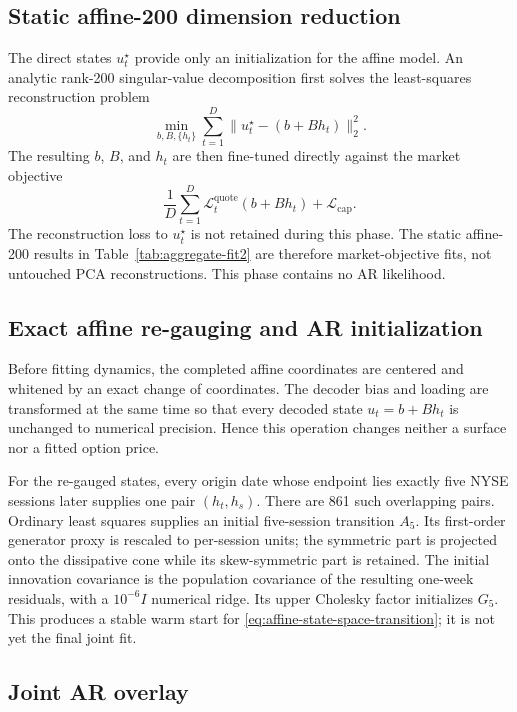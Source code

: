 \documentclass[11pt,a4paper]{article}
\begin{document}
\subsection{Static affine-200 dimension reduction}

The direct states $u_t^\star$ provide only an initialization for the affine
model.  An analytic rank-200 singular-value decomposition first solves the
least-squares reconstruction problem
\[
  \min_{b,B,\{h_t\}}
  \sum_{t=1}^{D}\lVert u_t^\star-(b+B h_t)\rVert_2^2.
\]
The resulting $b$, $B$, and $h_t$ are then fine-tuned directly against the
market objective
\begin{equation}
  \frac1D\sum_{t=1}^{D}
    \mathcal L_t^{\mathrm{quote}}(b+B h_t)
  +\mathcal L_{\mathrm{cap}}.
  \label{eq:static-affine-objective}
\end{equation}
The reconstruction loss to $u_t^\star$ is not retained during this phase.
The static affine-200 results in Table~\ref{tab:aggregate-fit2} are therefore
market-objective fits, not untouched PCA reconstructions.  This phase contains
no AR likelihood.

\subsection{Exact affine re-gauging and AR initialization}

Before fitting dynamics, the completed affine coordinates are centered and
whitened by an exact change of coordinates.  The decoder bias and loading are
transformed at the same time so that every decoded state $u_t=b+B h_t$ is
unchanged to numerical precision.  Hence this operation changes neither a
surface nor a fitted option price.

For the re-gauged states, every origin date whose endpoint lies exactly five
NYSE sessions later supplies one pair $(h_t,h_s)$.  There are 861 such
overlapping pairs.  Ordinary least squares supplies an initial five-session
transition $A_5$.  Its first-order generator proxy is rescaled to per-session
units; the symmetric part is projected onto the dissipative cone while its
skew-symmetric part is retained.  The initial innovation covariance is the
population covariance of the resulting one-week residuals, with a
$10^{-6}I$ numerical ridge.  Its upper Cholesky factor initializes $G_5$.
This produces a stable warm start for
\eqref{eq:affine-state-space-transition}; it is not yet the final joint fit.

\subsection{Joint AR overlay}
\end{document}
